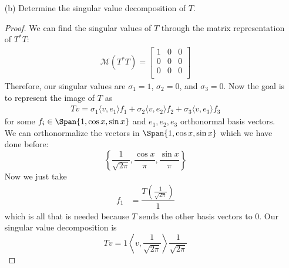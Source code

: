 \documentclass{article}
\begin{document}
\begin{enumerate}
	\item [(b)] Determine the singular value decomposition of $T$.
		\begin{proof}
			We can find the singular values of $T$ through the matrix representation of $T^{*}T$:
			\begin{align*}
				\mathcal{M}(T^{*}T) = 
					\begin{bmatrix}
						1 & 0 & 0 \\
						0 & 0 & 0 \\
						0 & 0 & 0 \\
					\end{bmatrix}
			\end{align*}
			Therefore, our singular values are $\sigma_{1} = 1$, $\sigma_{2} = 0$, and $\sigma_{3} = 0$. Now the goal is to represent the image of $T$ as 
			\begin{align*}
				Tv = \sigma_{1}\langle v, e_{1} \rangle f_{1} + \sigma_{2}\langle v, e_{2} \rangle f_{2} + \sigma_{3}\langle v, e_{3} \rangle f_{3}
			\end{align*}
			for some $f_{i} \in \Span\{1, \cos{x}, \sin{x}\}$ and $e_{1}, e_{2}, e_{3}$ orthonormal basis vectors. We can orthonormalize the vectors in $\Span\{1, \cos{x}, \sin{x}\}$ which we have done before:
			\begin{equation*}
				\left\{\dfrac{1}{\sqrt{2\pi}}, \dfrac{\cos{x}}{\pi}, \dfrac{\sin{x}}{\pi}\right\}
			\end{equation*}
			Now we just take 
			\begin{align*}
				f_{1} &= \dfrac{T(\frac{1}{\sqrt{2\pi}})}{1}
			\end{align*}
			which is all that is needed because $T$ sends the other basis vectors to 0. Our singular value decomposition is
			\begin{equation*}
				Tv = 1 \left\langle v, \dfrac{1}{\sqrt{2\pi}} \right\rangle \dfrac{1}{\sqrt{2\pi}}
			\end{equation*}
		\end{proof}
\end{enumerate}
\end{document}
